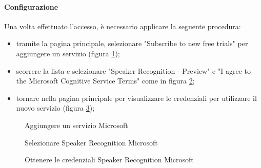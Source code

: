 \paragraph{Configurazione}
Una volta effettuato l'accesso, è necessario applicare la seguente procedura:
\begin{itemize}
	\item tramite la pagina principale, selezionare "Subscribe to new free trials" per aggiungere un servizio (figura \ref{fig:addMicrosoft});
	\item scorrere la lista e selezionare "Speaker Recognition - Preview" e "I agree to the Microsoft Cognitive Service Terms" come in figura \ref{fig:speakerRec};
	\item tornare nella pagina principale per visualizzare le credenziali per utilizzare il nuovo servizio (figura \ref{fig:credMicrosoft});
\end{itemize}

\begin{figure}[h]
	\caption{Aggiungere un servizio Microsoft}\label{fig:addMicrosoft}
\end{figure}
\begin{figure}[h]
	\caption{Selezionare Speaker Recognition Microsoft}\label{fig:speakerRec}
\end{figure}
\begin{figure}[h]
	\caption{Ottenere le credenziali Speaker Recognition Microsoft}\label{fig:credMicrosoft}
\end{figure}
\newpage
